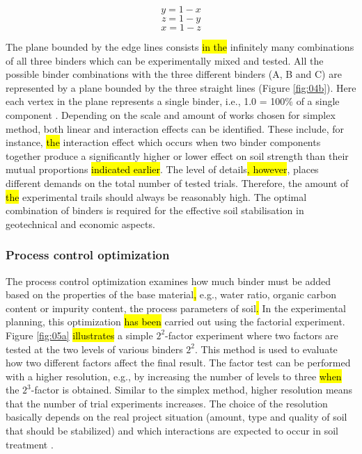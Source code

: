 \documentclass[materials,article,submit,pdftex,moreauthors]{Definitions/mdpi}
\begin{document}
\begin{equation}\label{eq:2}
y = 1 - x	
\end{equation}
\begin{equation}\label{eq:3}
z = 1 - y
\end{equation}
\begin{equation}\label{eq:4}
x = 1 - z
\end{equation}

The plane bounded by the edge lines consists \hl{in the }infinitely many combinations of all three binders which can be experimentally mixed and tested. All the possible binder combinations with the three different binders (A, B and C) are represented by a plane bounded by the three straight lines (Figure \ref{fig:04b}). Here each vertex in the plane represents a single binder, i.e., 1.0 = 100\% of a single component \cite{MyersMontgomery}. Depending on the scale and amount of works\hl{ }chosen for simplex method, both linear\hl{ }and interaction effects can be identified. These include, for instance, \hl{the} interaction effect which occurs when two binder components together produce a significantly higher or lower effect on soil strength than their mutual proportions \hl{indicated earlier}. The level of details\hl{, however}, places different demands on the total number of tested trials. Therefore, the amount of \hl{the} experimental trails should always be reasonably high. The optimal combination of binders is required for the effective soil stabilisation in geotechnical and economic aspects.

\subsubsection{Process control optimization}
The process control optimization examines how much binder must be added based on the properties of the base material\hl{, }e.g., water ratio, organic carbon content or impurity content, the process parameters of soil\hl{.} In the experimental planning, this optimization \hl{has been} carried out using the factorial experiment. Figure \ref{fig:05a} \hl{illustrates} a simple $2^2$-factor experiment\hl{ }where two factors are tested at the two levels of various binders $2^2$. This method is used to evaluate how two different factors affect the final result. The factor test can be performed with a higher resolution, e.g., by increasing the number of levels to three\hl{ when }the $2^3$-factor\hl{ }is\hl{ }obtained. Similar to the simplex method, higher resolution means that the number of trial experiments increases. The choice of the resolution basically depends on the real project situation (amount, type and quality of soil that should be stabilized) and which interactions are expected to occur in soil treatment \cite{Lindh2004}.
\end{document}
